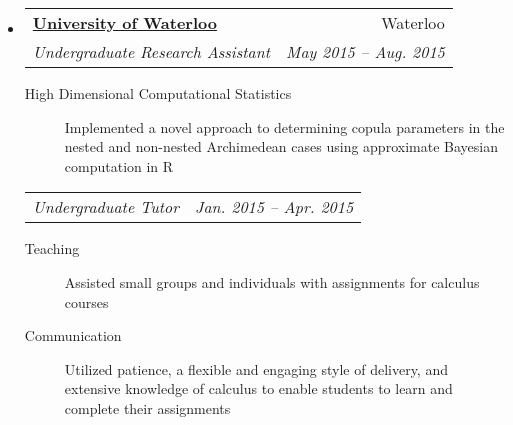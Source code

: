 \documentclass[letterpaper,11pt]{article}
\makeatletter
\newcommand{\resitem}[4]{\begin{tabular*}{17.5cm}{l@{\extracolsep{\fill}}r} \textbf{#1} & #2 \\ \textit{#3} & \textit{#4} \\ \end{tabular*} \vspace{-6pt}}
\newcommand{\ressubitem}[2]{\begin{tabular*}{17.5cm}{l@{\extracolsep{\fill}}r} \textit{#1} & \textit{#2} \\ \end{tabular*} \vspace{-6pt}}
\makeatother
\begin{document}
\begin{itemize}
\item
	\resitem{\href{https://uwaterloo.ca/}{University of Waterloo}}{Waterloo}{Undergraduate Research Assistant}{May 2015 -- Aug. 2015}
		{\footnotesize \begin{description}
				\item[High Dimensional Computational Statistics] Implemented a novel approach to determining copula parameters in the nested and non-nested Archimedean cases using approximate Bayesian computation in R
			\end{description}\vspace{-4pt}}
	\ressubitem{Undergraduate Tutor}{Jan. 2015 -- Apr. 2015}
		{\footnotesize \begin{description}
				\item[Teaching] Assisted small groups and individuals with assignments for calculus courses
				\item[Communication] Utilized patience, a flexible and engaging style of delivery, and extensive knowledge of calculus to enable students to learn and complete their assignments
			\end{description}}
\begin{comment}
\item
	\resitem{\href{https://www.bloomberg.com/research/stocks/private/snapshot.asp?privcapId=71456863}{Lightstream Resources Ltd.}}{Calgary, AB}{Exploitation Engineering Summer Student}{May 2014 -- Aug. 2014}
		{\footnotesize \begin{description}
				\item[Upstream Oil and Gas] Collected, organized, and analyzed, data in support of the analysis of drilling completions, fracturing, and production in the Saskatchewan Bakken operating area
				\item[Communication] {Identified data patterns that proved valuable in the future play development of Mississippian wells, presented and discussed findings with department technical and leadership staff}
			\end{description}}
\item
	\resitem{\href{http://trailswesthockey.com/}{Trails West Hockey Association}}{Calgary, AB}{On-Ice Official}{Sept. 2011 -- Mar. 2013}
		{\footnotesize \begin{description}
				\item[Teamwork and Leadership] Acted as both a linesman and a head referee for minor hockey games at the atom and peewee level, utilizing situational awareness, confidence in calls, memory of regulations, and initiative

\end{comment}
\end{itemize}
\end{document}
